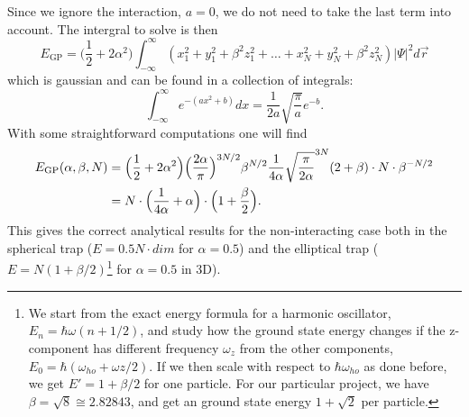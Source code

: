 \documentclass[norsk,a4paper,12pt]{article}
\begin{document}
Since we ignore the interaction, $a=0$, we do not need to take the last term into account. The intergral to solve is then
\begin{equation*}
E_{\text{GP}}=\Big(\frac{1}{2}+2\alpha^2\Big)\int_{-\infty}^{\infty}(x_1^2+y_1^2+\beta^2 z_1^2 + \hdots + x_N^2+y_N^2+\beta^2 z_N^2)|\Psi|^2d\vec{r}
\end{equation*}
which is gaussian and can be found in a collection of integrals:
\begin{equation}
\int_{-\infty}^{\infty}e^{-(ax^2+b)}dx=\frac{1}{2a}\sqrt{\frac{\pi}{a}}e^{-b}.
\end{equation}
With some straightforward computations one will find
\begin{align}
E_{\text{GP}}(\alpha,\beta,N)&=\Big(\frac{1}{2}+2\alpha^2\Big)\Big(\frac{2\alpha}{\pi}\Big)^{3N/2}\beta^{N/2}\frac{1}{4\alpha}\sqrt{\frac{\pi}{2\alpha}}^{3N}(2+\beta)\cdot N\cdot \beta^{-N/2}\notag\\
&=N\cdot\Big(\frac{1}{4\alpha}+\alpha\Big)\cdot\Big(1+\frac{\beta}{2}\Big).
\end{align}
This gives the correct analytical results for the non-interacting case both in the spherical trap ($E=0.5N\cdot dim$ for $\alpha=0.5$) and the elliptical trap ($E=N(1+\beta/2)$\footnote{We start from the exact energy formula for a harmonic oscillator, $E_n=\hbar\omega(n+1/2)$, and study how the ground state energy changes if the z-component has different frequency $\omega_z$ from the other components, $E_0=\hbar(\omega_{ho}+\omega{z}/2)$. If we then scale with respect to $\hbar\omega_{ho}$ as done before, we get $E'=1+\beta/2$ for one particle. For our particular project, we have $\beta=\sqrt{8}\cong2.82843$, and get an ground state energy $1+\sqrt{2}$ per particle.} for $\alpha=0.5$ in 3D).

\newpage
\end{document}
